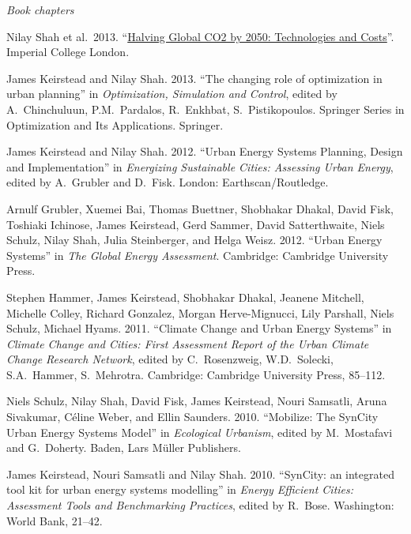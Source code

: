 \documentclass[11pt,a4paper]{article}
\begin{document}
\bigskip

\noindent\emph{Book chapters \vspace{0.01in}}

\ind Nilay Shah et al.\ 2013. ``\href{http://www3.imperial.ac.uk/climatechange/publications/collaborative/halving-global-co2-by-2050}{Halving Global CO2 by 2050: Technologies and Costs}''.  Imperial College London.

\ind James Keirstead and Nilay Shah. 2013. ``The changing role of optimization in urban planning'' in \emph{Optimization, Simulation and Control}, edited by A.\ Chinchuluun, P.M.\ Pardalos, R.\ Enkhbat, S.\ Pistikopoulos.  Springer Series in Optimization and Its Applications.  Springer.

\ind James Keirstead and Nilay Shah. 2012. ``Urban Energy Systems Planning, Design and Implementation'' in \emph{Energizing Sustainable Cities: Assessing Urban Energy}, edited by A.\ Grubler and D.\ Fisk. London: Earthscan/Routledge.

\ind Arnulf Grubler, Xuemei Bai, Thomas Buettner, Shobhakar Dhakal, David Fisk, Toshiaki Ichinose, James Keirstead, Gerd Sammer, David Satterthwaite, Niels Schulz, Nilay Shah, Julia Steinberger, and Helga Weisz. 2012. ``Urban Energy Systems'' in \emph{The Global Energy Assessment}. Cambridge: Cambridge University Press.

\ind Stephen Hammer, James Keirstead, Shobhakar Dhakal, Jeanene Mitchell, Michelle Colley, Richard Gonzalez, Morgan Herve-Mignucci, Lily Parshall, Niels Schulz, Michael Hyams. 2011. ``Climate Change and Urban Energy Systems'' in \emph{Climate Change and Cities: First Assessment Report of the Urban Climate Change Research Network}, edited by C.\ Rosenzweig, W.D.\ Solecki, S.A.\ Hammer, S.\ Mehrotra.  Cambridge: Cambridge University Press, 85--112.

\ind Niels Schulz, Nilay Shah, David Fisk, James Keirstead, Nouri Samsatli, Aruna Sivakumar, C\'{e}line Weber, and Ellin Saunders. 2010. ``Mobilize: The SynCity Urban Energy Systems Model'' in \emph{Ecological Urbanism}, edited by M.\ Mostafavi and G.\ Doherty.  Baden, Lars M\"{u}ller Publishers.

\ind James Keirstead, Nouri Samsatli and Nilay Shah. 2010. ``SynCity: an integrated tool kit for urban energy systems modelling'' in \emph{Energy Efficient Cities: Assessment Tools and Benchmarking Practices}, edited by R.\ Bose.  Washington: World Bank, 21--42.
\end{document}
